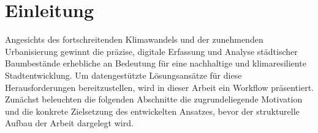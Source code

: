 \section{Einleitung}

Angesichts des fortschreitenden Klimawandels und der zunehmenden Urbanisierung gewinnt die präzise, digitale Erfassung und Analyse städtischer Baumbestände erhebliche an Bedeutung für eine nachhaltige und klimaresiliente Stadtentwicklung. Um datengestützte Lösungsansätze für diese Herausforderungen bereitzustellen, wird in dieser Arbeit ein Workflow präsentiert. Zunächst beleuchten die folgenden Abschnitte die zugrundeliegende Motivation und die konkrete Zielsetzung des entwickelten Ansatzes, bevor der strukturelle Aufbau der Arbeit dargelegt wird.

